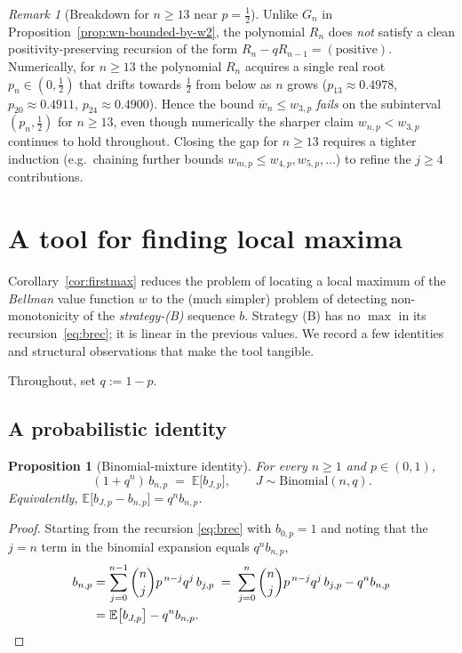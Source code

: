 \documentclass{article}
\newtheorem{proposition}{Proposition}
\theoremstyle{definition}
\theoremstyle{remark}
\newtheorem*{remark}{Remark}
\begin{document}
\begin{remark}[Breakdown for $n\ge 13$ near $p=\tfrac12$]
Unlike $G_n$ in Proposition~\ref{prop:wn-bounded-by-w2}, the
polynomial $R_n$ does \emph{not} satisfy a clean positivity-preserving
recursion of the form $R_n - qR_{n-1}=(\text{positive})$. Numerically,
for $n\ge 13$ the polynomial $R_n$ acquires a single real root
$p_n\in(0,\tfrac12)$ that drifts towards $\tfrac12$ from below as $n$
grows ($p_{13}\approx 0.4978$, $p_{20}\approx 0.4911$,
$p_{24}\approx 0.4900$). Hence the bound $\bar w_n\le w_{3,p}$
\emph{fails} on the subinterval $(p_n,\tfrac12)$ for $n\ge 13$,
even though numerically the sharper claim $w_{n,p}<w_{3,p}$ continues
to hold throughout. Closing the gap for $n\ge 13$ requires a tighter
induction (e.g.\ chaining further bounds $w_{m,p}\le w_{4,p},w_{5,p},\dots$)
to refine the $j\ge 4$ contributions.
\end{remark}

\section*{A tool for finding local maxima}

Corollary~\ref{cor:firstmax} reduces the problem of locating a local
maximum of the \emph{Bellman} value function $w$ to the (much simpler)
problem of detecting non-monotonicity of the \emph{strategy-(B)} sequence
$b$. Strategy (B) has no $\max$ in its recursion~\eqref{eq:brec}; it is
linear in the previous values. We record a few identities and structural
observations that make the tool tangible.

Throughout, set $q:=1-p$.

\subsection*{A probabilistic identity}

\begin{proposition}[Binomial-mixture identity]\label{prop:binmix}
For every $n\ge 1$ and $p\in(0,1)$,
\begin{equation}\label{eq:binmix}
  (1+q^{n})\,b_{n,p}\;=\;\mathbb E\bigl[b_{J,p}\bigr],
  \qquad J\sim\mathrm{Binomial}(n,q).
\end{equation}
Equivalently, $\mathbb E\bigl[b_{J,p}-b_{n,p}\bigr]=q^{n}b_{n,p}$.
\end{proposition}

\begin{proof}
Starting from the recursion \eqref{eq:brec} with $b_{0,p}=1$ and noting
that the $j=n$ term in the binomial expansion equals $q^{n}b_{n,p}$,
\begin{align*}
  b_{n,p}
  &=\sum_{j=0}^{n-1}\binom{n}{j}p^{\,n-j}q^{j}\,b_{j,p}
  \;=\;\sum_{j=0}^{n}\binom{n}{j}p^{\,n-j}q^{j}\,b_{j,p}-q^{n}b_{n,p}\\
  &=\mathbb E\bigl[b_{J,p}\bigr]-q^{n}b_{n,p}.\qed
\end{align*}
\renewcommand{\qed}{}
\end{proof}
\end{document}

